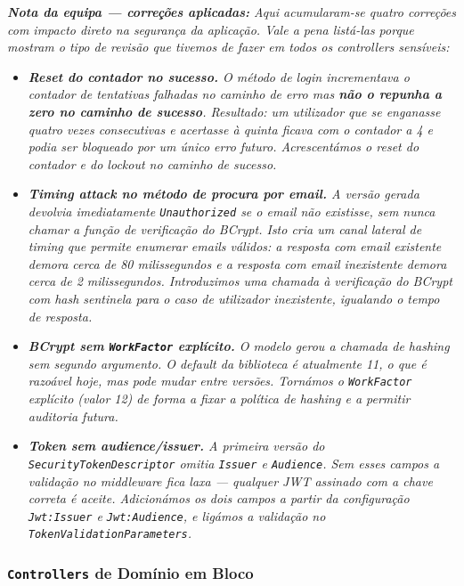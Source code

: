 \noindent\textit{\textbf{Nota da equipa --- correções aplicadas:} Aqui acumularam-se \emph{quatro} correções com impacto direto na segurança da aplicação. Vale a pena listá-las porque mostram o tipo de revisão que tivemos de fazer em \emph{todos} os \textit{controllers} sensíveis:}
\begin{itemize}
    \item \textit{\textbf{Reset do contador no sucesso.} O método de \textit{login} incrementava o contador de tentativas falhadas no caminho de erro mas \textbf{não o repunha a zero no caminho de sucesso}. Resultado: um utilizador que se enganasse quatro vezes consecutivas e acertasse à quinta ficava com o contador a 4 e podia ser bloqueado por \emph{um único} erro futuro. Acrescentámos o reset do contador e do \textit{lockout} no caminho de sucesso.}
    \item \textit{\textbf{\textit{Timing attack} no método de procura por email.} A versão gerada devolvia imediatamente \texttt{Unauthorized} se o email não existisse, sem nunca chamar a função de verificação do BCrypt. Isto cria um canal lateral de \textit{timing} que permite enumerar emails válidos: a resposta com email existente demora cerca de 80 milissegundos e a resposta com email inexistente demora cerca de 2 milissegundos. Introduzimos uma chamada à verificação do BCrypt com hash sentinela para o caso de utilizador inexistente, igualando o tempo de resposta.}
    \item \textit{\textbf{BCrypt sem \texttt{WorkFactor} explícito.} O modelo gerou a chamada de \textit{hashing} sem segundo argumento. O \textit{default} da biblioteca é atualmente 11, o que é razoável \emph{hoje}, mas pode mudar entre versões. Tornámos o \texttt{WorkFactor} explícito (valor 12) de forma a fixar a política de \textit{hashing} e a permitir auditoria futura.}
    \item \textit{\textbf{Token sem \textit{audience}/\textit{issuer}.} A primeira versão do \texttt{SecurityTokenDescriptor} omitia \texttt{Issuer} e \texttt{Audience}. Sem esses campos a validação no \textit{middleware} fica laxa --- qualquer JWT assinado com a chave correta é aceite. Adicionámos os dois campos a partir da configuração \texttt{Jwt:Issuer} e \texttt{Jwt:Audience}, e ligámos a validação no \texttt{TokenValidationParameters}.}
\end{itemize}

\subsubsection*{\texttt{Controllers} de Domínio em Bloco}


